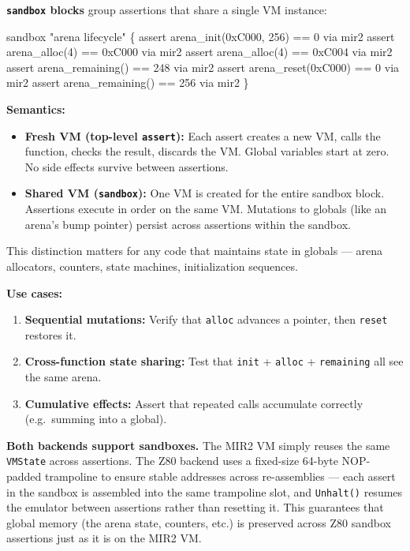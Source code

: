 \documentclass[
  11pt,
]{article}
\newenvironment{Shaded}{}{}
\newcommand{\NormalTok}[1]{#1}
\providecommand{\tightlist}{%
  \setlength{\itemsep}{0pt}\setlength{\parskip}{0pt}}
\begin{document}
\textbf{\texttt{sandbox} blocks} group assertions that share a single VM
instance:

\begin{Shaded}
\begin{Highlighting}[]
\NormalTok{sandbox "arena lifecycle" \{}
\NormalTok{    assert arena\_init(0xC000, 256) == 0 via mir2}
\NormalTok{    assert arena\_alloc(4) == 0xC000 via mir2}
\NormalTok{    assert arena\_alloc(4) == 0xC004 via mir2}
\NormalTok{    assert arena\_remaining() == 248 via mir2}
\NormalTok{    assert arena\_reset(0xC000) == 0 via mir2}
\NormalTok{    assert arena\_remaining() == 256 via mir2}
\NormalTok{\}}
\end{Highlighting}
\end{Shaded}

\textbf{Semantics:}

\begin{itemize}
\item
  \textbf{Fresh VM (top-level \texttt{assert}):} Each assert creates a
  new VM, calls the function, checks the result, discards the VM. Global
  variables start at zero. No side effects survive between assertions.
\item
  \textbf{Shared VM (\texttt{sandbox}):} One VM is created for the
  entire sandbox block. Assertions execute in order on the same VM.
  Mutations to globals (like an arena's bump pointer) persist across
  assertions within the sandbox.
\end{itemize}

This distinction matters for any code that maintains state in globals
--- arena allocators, counters, state machines, initialization
sequences.

\textbf{Use cases:}

\begin{enumerate}
\def\labelenumi{\arabic{enumi}.}
\tightlist
\item
  \textbf{Sequential mutations:} Verify that \texttt{alloc} advances a
  pointer, then \texttt{reset} restores it.
\item
  \textbf{Cross-function state sharing:} Test that \texttt{init} +
  \texttt{alloc} + \texttt{remaining} all see the same arena.
\item
  \textbf{Cumulative effects:} Assert that repeated calls accumulate
  correctly (e.g.~summing into a global).
\end{enumerate}

\textbf{Both backends support sandboxes.} The MIR2 VM simply reuses the
same \texttt{VMState} across assertions. The Z80 backend uses a
fixed-size 64-byte NOP-padded trampoline to ensure stable addresses
across re-assemblies --- each assert in the sandbox is assembled into
the same trampoline slot, and \texttt{Unhalt()} resumes the emulator
between assertions rather than resetting it. This guarantees that global
memory (the arena state, counters, etc.) is preserved across Z80 sandbox
assertions just as it is on the MIR2 VM.
\end{document}
